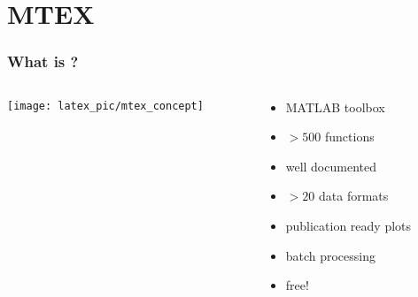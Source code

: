 
\frame[plain]{\titlepage}


\section{MTEX}

\begin{frame}
  \frametitle{What is \MTEX?}

  \begin{columns}



    \begin{column}{7.5cm}
      \begin{center}
        \texttt{[image: latex\_pic/mtex\_concept]}
      \end{center}
    \end{column}

    \begin{column}{5cm}
      \begin{itemize}
      \item MATLAB toolbox
      \item \alert{$>500$} functions
      \item well documented
      \item \alert{$>20$} data formats
      \item publication ready plots
      \item batch processing
      \item \alert{free!}
      \end{itemize}
    \end{column}

  \end{columns}





\end{frame}
